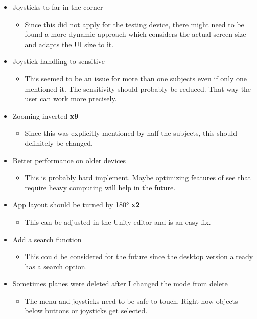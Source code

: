 \begin{itemize}
\begin{itemize}
  \end{itemize}
  \item Joysticks to far in the corner
  \begin{itemize}
    \item Since this did not apply for the testing device, there might need to be found a more dynamic approach which considers the actual screen size and adapts the UI size to it. 
  \end{itemize}
  \item Joystick handling to sensitive 
  \begin{itemize}
    \item This seemed to be an issue for more than one subjects even if only one mentioned it. The sensitivity should probably be reduced. That way the user can work more precisely.
  \end{itemize}
  \item Zooming inverted \textbf{x9}
  \begin{itemize}
    \item Since this was explicitly mentioned by half the subjects, this should definitely be changed. 
  \end{itemize}
  \item Better performance on older devices
  \begin{itemize}
    \item This is probably hard implement. Maybe optimizing features of \gls{see} that require heavy computing will help in the future.
  \end{itemize}
  \item App layout should be turned by 180° \textbf{x2}
  \begin{itemize}
    \item This can be adjusted in the Unity editor and is an easy fix. 
  \end{itemize}
  \item Add a search function
  \begin{itemize}
    \item This could be considered for the future since the desktop version already has a search option.
  \end{itemize}
  \item Sometimes \glspl{plane} were deleted after I changed the mode from delete
  \begin{itemize}
    \item The menu and joysticks need to be safe to touch. Right now objects below buttons or joysticks get selected.
  \end{itemize}
\end{itemize} 

